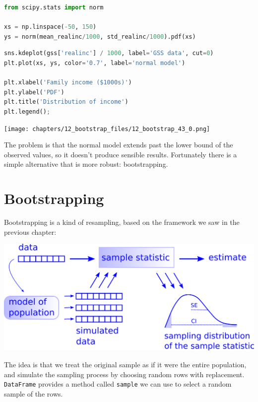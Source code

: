 \begin{lstlisting}[language=Python,style=source]
from scipy.stats import norm

xs = np.linspace(-50, 150)
ys = norm(mean_realinc/1000, std_realinc/1000).pdf(xs)
\end{lstlisting}

\begin{lstlisting}[language=Python,style=source]
sns.kdeplot(gss['realinc'] / 1000, label='GSS data', cut=0)
plt.plot(xs, ys, color='0.7', label='normal model')

plt.xlabel('Family income ($1000s)')
plt.ylabel('PDF')
plt.title('Distribution of income')
plt.legend();
\end{lstlisting}

\begin{center}
\texttt{[image: chapters/12\_bootstrap\_files/12\_bootstrap\_43\_0.png]}
\end{center}

The problem is that the normal model extends past the lower bound of the
observed values, so it doesn't produce sensible results. Fortunately
there is a simple alternative that is more robust: bootstrapping.

\hypertarget{bootstrapping}{%
\section{Bootstrapping}\label{bootstrapping}}

Bootstrapping is a kind of resampling, based on the framework we saw in
the previous chapter:

\includegraphics{chapters/figs/resampling.png}

The idea is that we treat the original sample as if it were the entire
population, and simulate the sampling process by choosing random rows
with replacement. \passthrough{\lstinline!DataFrame!} provides a method
called \passthrough{\lstinline!sample!} we can use to select a random
sample of the rows.

